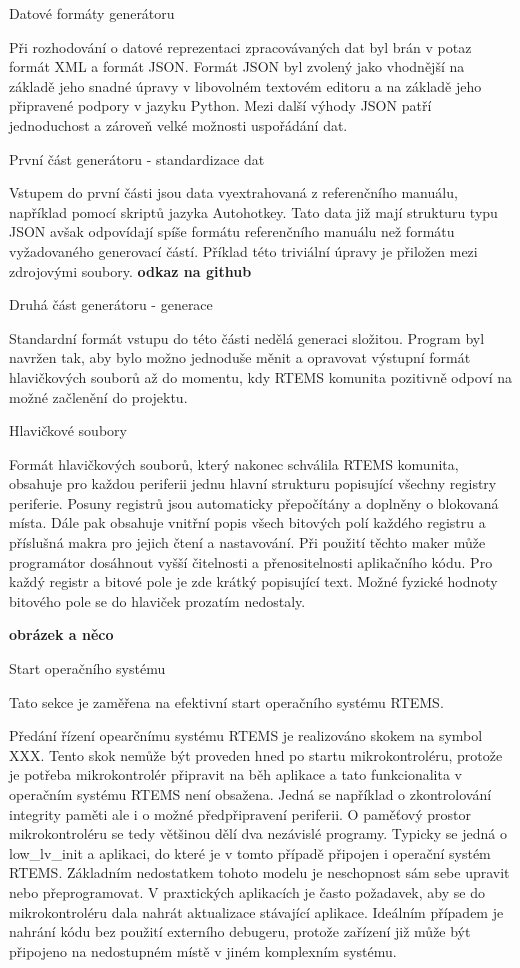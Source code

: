 \secc Datové formáty generátoru

	Při rozhodování o datové reprezentaci zpracovávaných dat byl brán v potaz formát XML a formát JSON.
Formát JSON byl zvolený jako vhodnější na základě jeho snadné úpravy v libovolném textovém editoru a na základě jeho připravené podpory v jazyku Python.
Mezi další výhody JSON patří jednoduchost a zároveň velké možnosti uspořádání dat. 

\secc První část generátoru - standardizace dat

	Vstupem do první části jsou data vyextrahovaná z referenčního manuálu, například pomocí skriptů jazyka Autohotkey.
Tato data již mají strukturu typu JSON avšak odpovídají spíše formátu referenčního manuálu než formátu vyžadovaného generovací částí.
Příklad této triviální úpravy je přiložen mezi zdrojovými soubory. {\bf odkaz na github}

\secc Druhá část generátoru - generace

	Standardní formát vstupu do této části nedělá generaci složitou.
Program byl navržen tak, aby bylo možno jednoduše měnit a opravovat výstupní formát hlavičkových souborů až do momentu, kdy RTEMS komunita pozitivně odpoví na možné začlenění do projektu.

\secc Hlavičkové soubory

	Formát hlavičkových souborů, který nakonec schválila RTEMS komunita, obsahuje pro každou periferii jednu hlavní strukturu popisující všechny registry periferie.
Posuny registrů jsou automaticky přepočítány a doplněny o blokovaná místa.
Dále pak obsahuje vnitřní popis všech bitových polí každého registru a příslušná makra pro jejich čtení a nastavování.
Při použití těchto maker může programátor dosáhnout vyšší čitelnosti a přenositelnosti aplikačního kódu.
Pro každý registr a bitové pole je zde krátký popisující text.
Možné fyzické hodnoty bitového pole se do hlaviček prozatím nedostaly.

{\bf obrázek a něco}

\sec Start operačního systému

	Tato sekce je zaměřena na efektivní start operačního systému RTEMS.

	Předání řízení opearčnímu systému RTEMS je realizováno skokem na symbol XXX.
Tento skok nemůže být proveden hned po startu mikrokontroléru, protože je potřeba mikrokontrolér připravit na běh aplikace a tato funkcionalita v operačním systému RTEMS není obsažena.
Jedná se například o zkontrolování integrity paměti ale i o možné předpřipravení periferii.
O paměťový prostor mikrokontroléru se tedy většinou dělí dva nezávislé programy.
Typicky se jedná o low\_lv\_init a aplikaci, do které je v tomto případě připojen i operační systém RTEMS.
Základním nedostatkem tohoto modelu je neschopnost sám sebe upravit nebo přeprogramovat.
V praxtických aplikacích je často požadavek, aby se do mikrokontroléru dala nahrát aktualizace stávající aplikace.
Ideálním případem je nahrání kódu bez použití externího debugeru, protože zařízení již může být připojeno na nedostupném místě v jiném komplexním systému.

